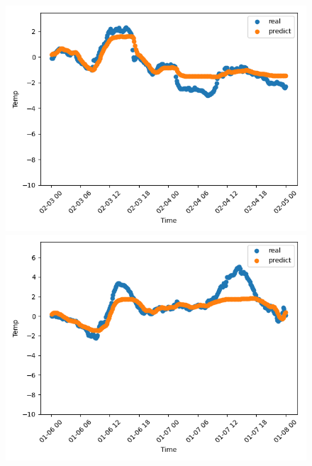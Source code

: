 \documentclass{article}
\begin{document}
\begin{figure}[H]
    \begin{minipage}[H]{0.3\linewidth}
        \centering
        \includegraphics[width=\textwidth]{figures/weather_mid1.png}
    \end{minipage}
    \begin{minipage}[H]{0.3\linewidth}
        \centering
        \includegraphics[width=\textwidth]{figures/weather_mid2.png}
    \end{minipage}
    \begin{minipage}[H]{0.3\linewidth}
        \centering

\end{minipage}
\end{figure}
\end{document}
